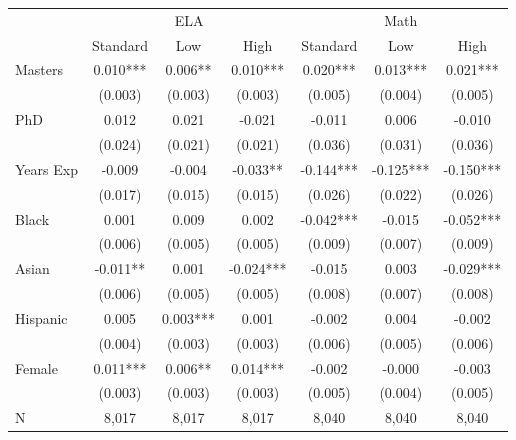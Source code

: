 \renewcommand{\arraystretch}{1.2}

\begin{tabular}{lcccccc}
    \toprule
    \midrule
     & \multicolumn{3}{c}{ELA} & \multicolumn{3}{c}{Math} \\
     & Standard & Low & High & Standard & Low & High \\
    \midrule
    Masters & 0.010*** & 0.006** & 0.010*** & 0.020*** & 0.013*** & 0.021*** \\
     & (0.003) & (0.003) & (0.003) & (0.005) & (0.004) & (0.005) \\
    PhD & 0.012 & 0.021 & -0.021 & -0.011 & 0.006 & -0.010 \\
     & (0.024) & (0.021) & (0.021) & (0.036) & (0.031) & (0.036) \\
    Years Exp & -0.009 & -0.004 & -0.033** & -0.144*** & -0.125*** & -0.150*** \\
     & (0.017) & (0.015) & (0.015) & (0.026) & (0.022) & (0.026) \\
    Black & 0.001 & 0.009 & 0.002 & -0.042*** & -0.015 & -0.052*** \\
     & (0.006) & (0.005) & (0.005) & (0.009) & (0.007) & (0.009) \\
    Asian & -0.011** & 0.001 & -0.024*** & -0.015 & 0.003 & -0.029*** \\
     & (0.006) & (0.005) & (0.005) & (0.008) & (0.007) & (0.008) \\
    Hispanic & 0.005 & 0.003*** & 0.001 & -0.002 & 0.004 & -0.002 \\
     & (0.004) & (0.003) & (0.003) & (0.006) & (0.005) & (0.006) \\
    Female & 0.011*** & 0.006** & 0.014*** & -0.002 & -0.000 & -0.003 \\
     & (0.003) & (0.003) & (0.003) & (0.005) & (0.004) & (0.005) \\
    \midrule
    N & 8,017 & 8,017 & 8,017 & 8,040 & 8,040 & 8,040 \\
    \midrule
    \bottomrule
\end{tabular}
